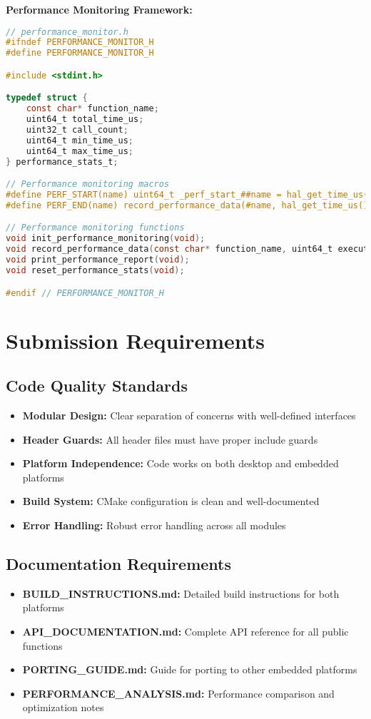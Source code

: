 \documentclass[11pt,a4paper]{article}
\begin{document}
\textbf{Performance Monitoring Framework:}
\begin{lstlisting}[language=C]
// performance_monitor.h
#ifndef PERFORMANCE_MONITOR_H
#define PERFORMANCE_MONITOR_H

#include <stdint.h>

typedef struct {
    const char* function_name;
    uint64_t total_time_us;
    uint32_t call_count;
    uint64_t min_time_us;
    uint64_t max_time_us;
} performance_stats_t;

// Performance monitoring macros
#define PERF_START(name) uint64_t _perf_start_##name = hal_get_time_us()
#define PERF_END(name) record_performance_data(#name, hal_get_time_us() - _perf_start_##name)

// Performance monitoring functions
void init_performance_monitoring(void);
void record_performance_data(const char* function_name, uint64_t execution_time);
void print_performance_report(void);
void reset_performance_stats(void);

#endif // PERFORMANCE_MONITOR_H
\end{lstlisting}

\section{Submission Requirements}

\subsection{Code Quality Standards}
\begin{itemize}
    \item \textbf{Modular Design:} Clear separation of concerns with well-defined interfaces
    \item \textbf{Header Guards:} All header files must have proper include guards
    \item \textbf{Platform Independence:} Code works on both desktop and embedded platforms
    \item \textbf{Build System:} CMake configuration is clean and well-documented
    \item \textbf{Error Handling:} Robust error handling across all modules
\end{itemize}

\subsection{Documentation Requirements}
\begin{itemize}
    \item \textbf{BUILD\_INSTRUCTIONS.md:} Detailed build instructions for both platforms
    \item \textbf{API\_DOCUMENTATION.md:} Complete API reference for all public functions
    \item \textbf{PORTING\_GUIDE.md:} Guide for porting to other embedded platforms
    \item \textbf{PERFORMANCE\_ANALYSIS.md:} Performance comparison and optimization notes
\end{itemize}
\end{document}
